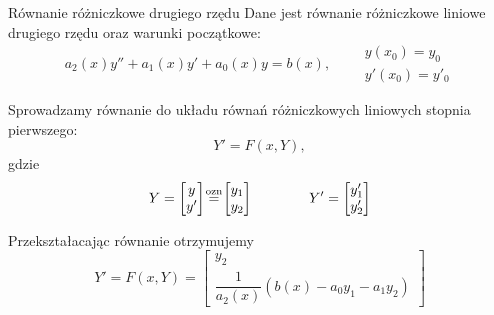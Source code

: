 \documentclass[9pt]{beamer}
\newcommand\eqozn{\mathrel{\overset{\makebox[0pt]{\mbox{\scriptsize ozn}}}{=}}}
\begin{document}
\begin{frame}{Równanie różniczkowe drugiego rzędu}
    Dane jest równanie różniczkowe liniowe drugiego rzędu oraz warunki początkowe:
    \begin{equation*}
        \label{eq2}
        a_2(x)y'' + a_1(x)y' + a_0(x)y = b(x), \qquad \begin{matrix}y(x_0) = y_0 \\ y'(x_0) = y'_0\end{matrix}
    \end{equation*}

    Sprowadzamy równanie do układu równań różniczkowych liniowych stopnia pierwszego: 
    \[ Y' = F(x,Y), \] gdzie
    \begin{equation*}
        Y = \begin{bmatrix} y \\ y' \end{bmatrix} \eqozn \begin{bmatrix} y_1 \\ y_2 \end{bmatrix} \qquad\qquad Y' = \begin{bmatrix} y_1' \\ y_2' \end{bmatrix}
    \end{equation*}

    Przekształacając równanie otrzymujemy
    \begin{equation*}
        Y' = F(x,Y) = \begin{bmatrix} y_2 \\ \dfrac{1}{a_2(x)}(b(x) - a_0y_1 - a_1y_2) \end{bmatrix}
    \end{equation*}
    
\end{frame}
\end{document}
